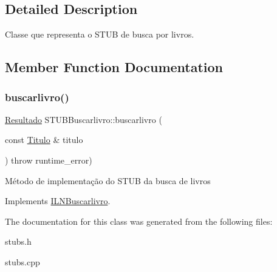 \subsection{Detailed Description}
Classe que representa o S\+T\+UB de busca por livros. 

\subsection{Member Function Documentation}
\mbox{\label{classSTUBBuscarlivro_accbcec2b22c7b768e488e96624d9a9d6}} 
\subsubsection{\texorpdfstring{buscarlivro()}{buscarlivro()}}
{\footnotesize\ttfamily \hyperlink{classResultado}{Resultado} S\+T\+U\+B\+Buscarlivro\+::buscarlivro (\begin{DoxyParamCaption}\item[{const \hyperlink{classTitulo}{Titulo} \&}]{titulo }\end{DoxyParamCaption}) throw  runtime\+\_\+error) \hspace{0.3cm}{\ttfamily [virtual]}}

Método de implementação do S\+T\+UB da busca de livros 

Implements \hyperlink{classILNBuscarlivro}{I\+L\+N\+Buscarlivro}.



The documentation for this class was generated from the following files\+:\begin{DoxyCompactItemize}
\item 
stubs.\+h\item 
stubs.\+cpp\end{DoxyCompactItemize}
